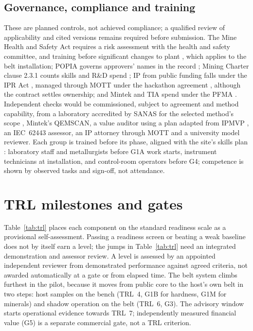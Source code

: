 \documentclass[10pt,a4paper,twocolumn]{article}
\begin{document}
\subsection{Governance, compliance and training}

These are planned controls, not achieved compliance; a qualified review of applicability and cited versions remains required before submission. The Mine Health and Safety Act requires a risk assessment with the health and safety committee, and training before significant changes to plant \cite{mhsa}, which applies to the belt installation; POPIA governs approvers' names in the record \cite{popia}; Mining Charter clause 2.3.1 counts skills and R\&D spend \cite{charter2018}; IP from public funding falls under the IPR Act \cite{ipract}, managed through MOTT under the hackathon agreement \cite{faq}, although the contract settles ownership; and Mintek and TIA spend under the PFMA \cite{pfma}. Independent checks would be commissioned, subject to agreement and method capability, from a laboratory accredited by SANAS for the selected method's scope \cite{sanas}, Mintek's QEMSCAN, a value auditor using a plan adapted from IPMVP \cite{ipmvp}, an IEC~62443 assessor, an IP attorney through MOTT and a university model reviewer. Each group is trained before its phase, aligned with the site's skills plan \cite{mqa}: laboratory staff and metallurgists before G1A work starts, instrument technicians at installation, and control-room operators before G4; competence is shown by observed tasks and sign-off, not attendance.

\section{TRL milestones and gates}\label{sec:roadmap}

Table~\ref{tab:trl} places each component on the standard readiness scale \cite{trl} as a provisional self-assessment. Passing a readiness screen or beating a weak baseline does not by itself earn a level; the jumps in Table~\ref{tab:trl} need an integrated demonstration and assessor review. A level is assessed by an appointed independent reviewer from demonstrated performance against agreed criteria, not awarded automatically at a gate or from elapsed time. The belt system climbs furthest in the pilot, because it moves from public core to the host's own belt in two steps: host samples on the bench (TRL~4, G1B for hardness, G1M for minerals) and shadow operation on the belt (TRL~6, G3). The advisory window starts operational evidence towards TRL~7; independently measured financial value (G5) is a separate commercial gate, not a TRL criterion.
\end{document}
